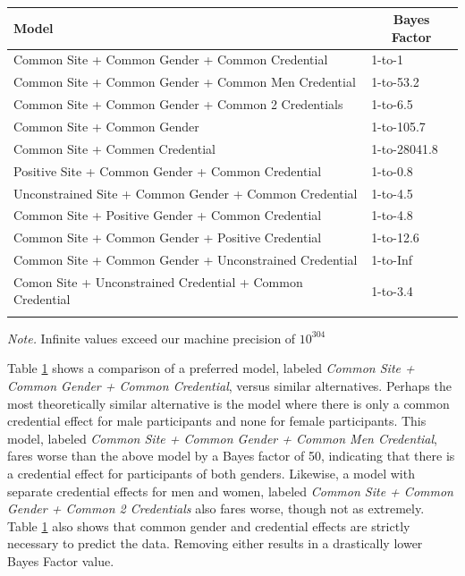 \documentclass[english,man]{apa6}
\theoremstyle{definition}
\theoremstyle{definition}
\theoremstyle{remark}
\begin{document}
\begin{table}[tbp]
\begin{center}
\begin{threeparttable}
\caption{\label{tab:ml3BF}}
\begin{tabular}{ll}
\toprule
Model & \multicolumn{1}{c}{Bayes Factor}\\
\midrule
Common Site + Common Gender + Common Credential & 1-to-1\\
Common Site + Common Gender + Common Men Credential & 1-to-53.2\\
Common Site + Common Gender + Common 2 Credentials & 1-to-6.5\\
Common Site + Common Gender & 1-to-105.7\\
Common Site + Commen Credential & 1-to-28041.8\\
Positive Site + Common Gender + Common Credential & 1-to-0.8\\
Unconstrained Site + Common Gender + Common Credential & 1-to-4.5\\
Common Site + Positive Gender + Common Credential & 1-to-4.8\\
Common Site + Common Gender + Positive Credential & 1-to-12.6\\
Common Site + Common Gender + Unconstrained Credential & 1-to-Inf\\
Comon Site + Unconstrained Credential + Common Credential & 1-to-3.4\\
\bottomrule
\addlinespace
\end{tabular}
\begin{tablenotes}[para]
\textit{Note.} Infinite values exceed our machine precision of $10^304$
\end{tablenotes}
\end{threeparttable}
\end{center}
\end{table}

Table \ref{tab:ml3BF} shows a comparison of a preferred model, labeled
\emph{Common Site + Common Gender + Common Credential}, versus similar
alternatives. Perhaps the most theoretically similar alternative is the
model where there is only a common credential effect for male
participants and none for female participants. This model, labeled
\emph{Common Site + Common Gender + Common Men Credential}, fares worse
than the above model by a Bayes factor of 50, indicating that there is a
credential effect for participants of both genders. Likewise, a model
with separate credential effects for men and women, labeled \emph{Common
Site + Common Gender + Common 2 Credentials} also fares worse, though
not as extremely. Table \ref{tab:ml3BF} also shows that common gender
and credential effects are strictly necessary to predict the data.
Removing either results in a drastically lower Bayes Factor value.
\end{document}
